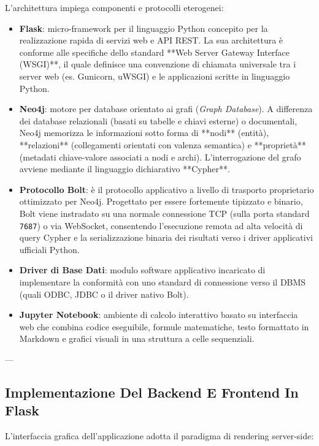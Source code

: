 \documentclass[11pt, a4paper]{article}
\begin{document}
L'architettura impiega componenti e protocolli eterogenei:
\begin{itemize}
    \item \textbf{Flask}: micro-framework per il linguaggio Python concepito per la realizzazione rapida di servizi web e API REST. La sua architettura è conforme alle specifiche dello standard **Web Server Gateway Interface (WSGI)**, il quale definisce una convenzione di chiamata universale tra i server web (es. Gunicorn, uWSGI) e le applicazioni scritte in linguaggio Python.
    \item \textbf{Neo4j}: motore per database orientato ai grafi (\emph{Graph Database}). A differenza dei database relazionali (basati su tabelle e chiavi esterne) o documentali, Neo4j memorizza le informazioni sotto forma di **nodi** (entità), **relazioni** (collegamenti orientati con valenza semantica) e **proprietà** (metadati chiave-valore associati a nodi e archi). L'interrogazione del grafo avviene mediante il linguaggio dichiarativo **Cypher**.
    \item \textbf{Protocollo Bolt}: è il protocollo applicativo a livello di trasporto proprietario ottimizzato per Neo4j. Progettato per essere fortemente tipizzato e binario, Bolt viene instradato su una normale connessione TCP (sulla porta standard \texttt{7687}) o via WebSocket, consentendo l'esecuzione remota ad alta velocità di query Cypher e la serializzazione binaria dei risultati verso i driver applicativi ufficiali Python.
    \item \textbf{Driver di Base Dati}: modulo software applicativo incaricato di implementare la conformità con uno standard di connessione verso il DBMS (quali ODBC, JDBC o il driver nativo Bolt).
    \item \textbf{Jupyter Notebook}: ambiente di calcolo interattivo basato su interfaccia web che combina codice eseguibile, formule matematiche, testo formattato in Markdown e grafici visuali in una struttura a celle sequenziali.
\end{itemize}

---

\subsection{Implementazione Del Backend E Frontend In Flask}

L'interfaccia grafica dell'applicazione adotta il paradigma di rendering server-side:

\end{document}
